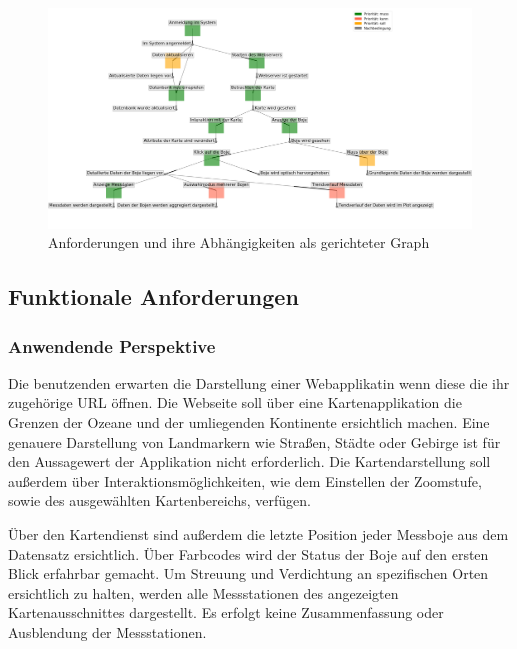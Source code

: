     \begin{figure}[h!]
    \centering
    \includegraphics[width=\textwidth]{pix/graph_anforderungen.png}
    \caption{Anforderungen und ihre Abhängigkeiten als gerichteter Graph}
    \label{fig:graph_anforderungen}
    \end{figure}
    
     
    \subsection{Funktionale Anforderungen}
    
    \subsubsection{Anwendende Perspektive}
    
    Die benutzenden erwarten die Darstellung einer Webapplikatin wenn diese die ihr zugehörige URL öffnen. Die Webseite soll über eine Kartenapplikation die Grenzen der Ozeane und der umliegenden Kontinente ersichtlich machen.  Eine genauere Darstellung von Landmarkern wie Straßen, Städte oder Gebirge ist für den Aussagewert der Applikation nicht erforderlich. Die Kartendarstellung soll außerdem über Interaktionsmöglichkeiten, wie dem Einstellen der Zoomstufe, sowie des ausgewählten Kartenbereichs, verfügen.
    
    Über den Kartendienst sind außerdem die letzte Position jeder Messboje aus dem Datensatz ersichtlich. Über Farbcodes wird der Status der Boje auf den ersten Blick erfahrbar gemacht. Um Streuung und Verdichtung an spezifischen Orten ersichtlich zu halten, werden alle Messstationen des angezeigten Kartenausschnittes dargestellt. Es erfolgt keine Zusammenfassung oder Ausblendung der Messstationen.
    
